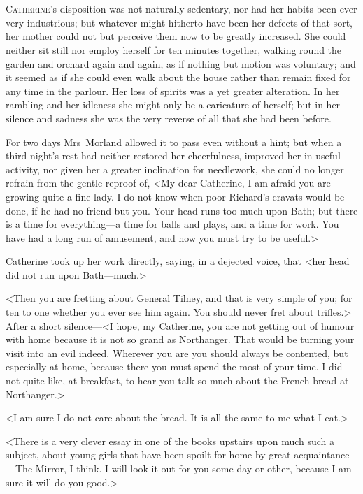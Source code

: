 \chapter[Chapter \thechapter]{} 

 \lettrine{C}{atherine}'s disposition was not naturally sedentary, nor had her habits been ever very industrious; but whatever might hitherto have been her defects of that sort, her mother could not but perceive them now to be greatly increased. She could neither sit still nor employ herself for ten minutes together, walking round the garden and orchard again and again, as if nothing but motion was voluntary; and it seemed as if she could even walk about the house rather than remain fixed for any time in the parlour. Her loss of spirits was a yet greater alteration. In her rambling and her idleness she might only be a caricature of herself; but in her silence and sadness she was the very reverse of all that she had been before. 

 For two days Mrs~Morland allowed it to pass even without a hint; but when a third night's rest had neither restored her cheerfulness, improved her in useful activity, nor given her a greater inclination for needlework, she could no longer refrain from the gentle reproof of, <My dear Catherine, I am afraid you are growing quite a fine lady. I do not know when poor Richard's cravats would be done, if he had no friend but you. Your head runs too much upon Bath; but there is a time for everything—a time for balls and plays, and a time for work. You have had a long run of amusement, and now you must try to be useful.> 

 Catherine took up her work directly, saying, in a dejected voice, that <her head did not run upon Bath—much.> 

 <Then you are fretting about General Tilney, and that is very simple of you; for ten to one whether you ever see him again. You should never fret about trifles.> After a short silence—<I hope, my Catherine, you are not getting out of humour with home because it is not so grand as Northanger. That would be turning your visit into an evil indeed. Wherever you are you should always be contented, but especially at home, because there you must spend the most of your time. I did not quite like, at breakfast, to hear you talk so much about the French bread at Northanger.> 

 <I am sure I do not care about the bread. It is all the same to me what I eat.> 

 <There is a very clever essay in one of the books upstairs upon much such a subject, about young girls that have been spoilt for home by great acquaintance—The Mirror, I think. I will look it out for you some day or other, because I am sure it will do you good.> 

